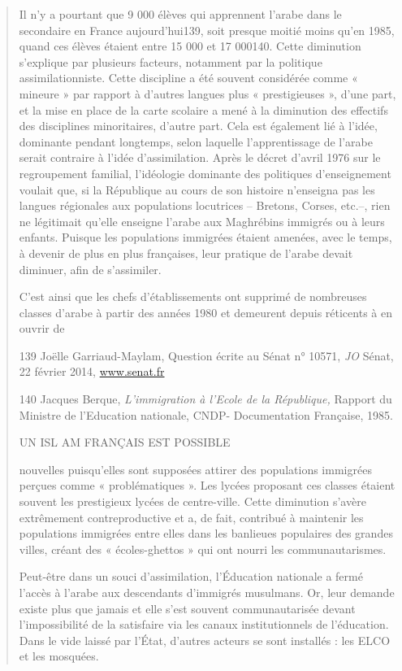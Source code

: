 \begin{quote}
Il n'y a pourtant que 9 000 élèves qui apprennent l'arabe dans le
secondaire en France aujourd'hui139, soit presque moitié moins qu'en
1985, quand ces élèves étaient entre 15 000 et 17 000140. Cette
diminution s'explique par plusieurs facteurs, notamment par la politique
assimilationniste. Cette discipline a été souvent considérée comme «
mineure » par rapport à d'autres langues plus « prestigieuses », d'une
part, et la mise en place de la carte scolaire a mené à la diminution
des effectifs des disciplines minoritaires, d'autre part. Cela est
également lié à l'idée, dominante pendant longtemps, selon laquelle
l'apprentissage de l'arabe serait contraire à l'idée d'assimilation.
Après le décret d'avril 1976 sur le regroupement familial, l'idéologie
dominante des politiques d'enseignement voulait que, si la République au
cours de son histoire n'enseigna pas les langues régionales aux
populations locutrices -- Bretons, Corses, etc.--, rien ne légitimait
qu'elle enseigne l'arabe aux Maghrébins immigrés ou à leurs enfants.
Puisque les populations immigrées étaient amenées, avec le temps, à
devenir de plus en plus françaises, leur pratique de l'arabe devait
diminuer, afin de s'assimiler.

C'est ainsi que les chefs d'établissements ont supprimé de nombreuses
classes d'arabe à partir des années 1980 et demeurent depuis réticents à
en ouvrir de

139 Joëlle Garriaud-Maylam, Question écrite au Sénat n° 10571, \emph{JO}
Sénat, 22 février 2014, \href{http://www.senat.fr/}{www.senat.fr}

140 Jacques Berque, \emph{L'immigration à l'Ecole de la République,}
Rapport du Ministre de l'Education nationale, CNDP- Documentation
Française, 1985.

UN ISL AM FRANÇAIS EST POSSIBLE

nouvelles puisqu'elles sont supposées attirer des populations immigrées
perçues comme « problématiques ». Les lycées proposant ces classes
étaient souvent les prestigieux lycées de centre-ville. Cette diminution
s'avère extrêmement contreproductive et a, de fait, contribué à
maintenir les populations immigrées entre elles dans les banlieues
populaires des grandes villes, créant des « écoles-ghettos » qui ont
nourri les communautarismes.

Peut-être dans un souci d'assimilation, l'Éducation nationale a fermé
l'accès à l'arabe aux descendants d'immigrés musulmans. Or, leur demande
existe plus que jamais et elle s'est souvent communautarisée devant
l'impossibilité de la satisfaire via les canaux institutionnels de
l'éducation. Dans le vide laissé par l'État, d'autres acteurs se sont
installés : les ELCO et les mosquées.
\end{quote}


